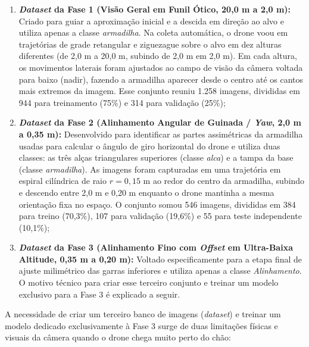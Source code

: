 \begin{enumerate}
	\item \textbf{\textit{Dataset} da Fase 1 (Visão Geral em Funil Ótico, 20,0 m a 2,0 m):} Criado para guiar a aproximação inicial e a descida em direção ao alvo e utiliza apenas a classe \textit{armadilha}. Na coleta automática, o drone voou em trajetórias de grade retangular e ziguezague sobre o alvo em dez alturas diferentes (de 2,0 m a 20,0 m, subindo de 2,0 m em 2,0 m). Em cada altura, os movimentos laterais foram ajustados ao campo de visão da câmera voltada para baixo (nadir), fazendo a armadilha aparecer desde o centro até os cantos mais extremos da imagem. Esse conjunto reuniu 1.258 imagens, divididas em 944 para treinamento (75\%) e 314 para validação (25\%);
	
	\item \textbf{\textit{Dataset} da Fase 2 (Alinhamento Angular de Guinada / \textit{Yaw}, 2,0 m a 0,35 m):} Desenvolvido para identificar as partes assimétricas da armadilha usadas para calcular o ângulo de giro horizontal do drone e utiliza duas classes: as três alças triangulares superiores (classe \textit{alca}) e a tampa da base (classe \textit{armadilha}). As imagens foram capturadas em uma trajetória em espiral cilíndrica de raio $r = 0{,}15\text{ m}$ ao redor do centro da armadilha, subindo e descendo entre 2,0 m e 0,20 m enquanto o drone mantinha a mesma orientação fixa no espaço. O conjunto somou 546 imagens, divididas em 384 para treino (70,3\%), 107 para validação (19,6\%) e 55 para teste independente (10,1\%);
	
	\item \textbf{\textit{Dataset} da Fase 3 (Alinhamento Fino com \textit{Offset} em Ultra-Baixa Altitude, 0,35 m a 0,20 m):} Voltado especificamente para a etapa final de ajuste milimétrico das garras inferiores e utiliza apenas a classe \textit{Alinhamento}. O motivo técnico para criar esse terceiro conjunto e treinar um modelo exclusivo para a Fase 3 é explicado a seguir.
\end{enumerate}


A necessidade de criar um terceiro banco de imagens (\textit{dataset}) e treinar um modelo dedicado exclusivamente à Fase 3 surge de duas limitações físicas e visuais da câmera quando o drone chega muito perto do chão:

